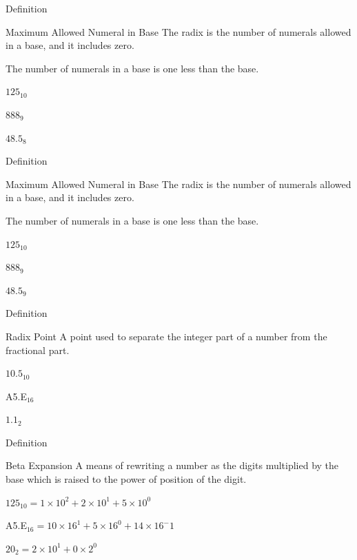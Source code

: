 \documentclass{beamer}
\begin{document}
\begin{frame}{Definition}
  \begin{block}{Maximum Allowed Numeral in Base}
    The radix is the number of numerals allowed in a base, and it includes zero. \pause

    The number of numerals in a base is one less than the base.
  \end{block}\pause

  \begin{example}\pause
    $125_{10}$ \pause

    $888_9$ \pause

    $48.5_8$
  \end{example}
\end{frame}
\begin{frame}{Definition}
  \addtocounter{framenumber}{-1}
  \begin{block}{Maximum Allowed Numeral in Base}
    The radix is the number of numerals allowed in a base, and it includes zero.

    The number of numerals in a base is one less than the base.
  \end{block}

  \begin{example}
    $125_{10}$

    $888_9$

    $48.5_9$
  \end{example}
\end{frame}

\begin{frame}{Definition}
  \begin{block}{Radix Point}
    A point used to separate the integer part of a number from the fractional part.
  \end{block}\pause

  \begin{example}\pause
      $10.5_{10}$ \pause

      A5.E$_{16}$ \pause

      $1.1_2$
  \end{example}
\end{frame}

\begin{frame}{Definition}
  \begin{block}{Beta Expansion}
    A means of rewriting a number as the digits multiplied by the base which is raised to the power of position of the digit.
  \end{block}\pause

  \begin{example}\pause
    $125_{10} = 1\times10^2 + 2\times10^1 + 5\times10^0$ \pause

    A5.E$_{16} = 10\times16^1 + 5\times16^0 + 14\times16^-1$ \pause

    $20_2 = 2\times10^1+0\times2^0$
  \end{example}
\end{frame}
\end{document}
